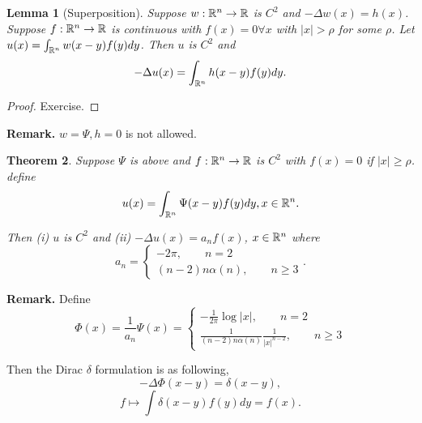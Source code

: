 \documentclass[11pt]{amsart}%
\newtheorem{theorem}{Theorem}
\newtheorem{lemma}[theorem]{Lemma}
\begin{document}
\begin{lemma}[Superposition] Suppose \(w:\mathbb{R}^n\to \mathbb{R}\) is \(C^2\) and
\(-\Delta w(x)=h(x)\). Suppose \(f:\mathbb{R}^n\to \mathbb{R}\) is continuous with
\(f(x)=0 \forall x\) with \(\vert x\vert >\rho\) for some \(\rho\). Let
\(u(x)=\int_{\mathbb{R}^n}w(x-y)f(y)dy\). Then \(u\) is \(C^2\) and
\[-\Delta u(x)=\int_{\mathbb{R}^n} h(x-y)f(y)dy.\]
\end{lemma}
\begin{proof} Exercise.
\end{proof}

\textbf{Remark.} \(w=\Psi, h=0\) is not allowed.

\begin{theorem} Suppose \({\Psi}\) is above and \(f:\mathbb{R}^n\to \mathbb{R}\) is
\(C^2\) with \(f(x)=0\) if \(\vert x \vert \ge \rho\). define
\[u(x)= \int_{\mathbb{R}^n} {\Psi}(x-y)f(y)dy, x\in \mathbb{R}^n.\]

Then (i) \(u\) is \(C^2\) and (ii) \(-\Delta u(x)=a_nf(x)\),
\(x\in \mathbb{R}^n\) where \[a_n=\begin{cases} -2\pi, \qquad n=2 \\
      (n-2)n\alpha(n), \qquad n\ge 3\end{cases}.\]
\end{theorem}
\textbf{Remark.} Define
\[\Phi(x)=\frac{1}{a_n}{\Psi}(x)=\begin{cases}-\frac{1}{2\pi}\log\vert x\vert, \qquad n=2\\
\frac{1}{(n-2)n\alpha(n)}\frac{1}{\vert x\vert^{n-2}}, \qquad n\ge 3\end{cases}\]

Then the Dirac \(\delta\) formulation is as following,
\[-\Delta \Phi(x-y)=\delta(x-y),\]
\[f\mapsto \int\delta(x-y)f(y)dy = f(x).\]
\end{document}
